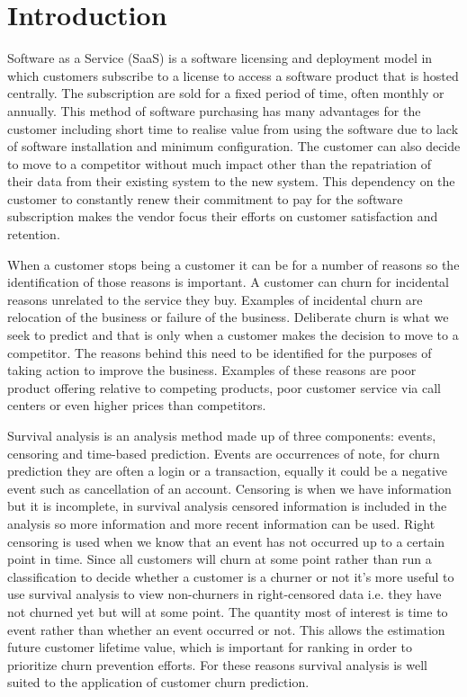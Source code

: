 \documentclass[final,a4paper,peerreviewca]{IEEEtran}
\begin{document}
\section{Introduction}
Software as a Service (SaaS) is a software licensing and deployment model in which customers subscribe to a license to access a software product that is hosted centrally. The subscription are sold for a fixed period of time, often monthly or annually. This method of software purchasing has many advantages for the customer including short time to realise value from using the software due to lack of software installation and minimum configuration. The customer can also decide to move to a competitor without much impact other than the repatriation of their data from their existing system to the new system. This dependency on the customer to constantly renew their commitment to pay for the software subscription makes the vendor focus their efforts on customer satisfaction and retention.

When a customer stops being a customer it can be for a number of reasons so the identification of those reasons is important. A customer can churn for incidental reasons unrelated to the service they buy. Examples of incidental churn are relocation of the business or failure of the business. Deliberate churn is what we seek to predict and that is only when a customer makes the decision to move to a competitor. The reasons behind this need to be identified for the purposes of taking action to improve the business. Examples of these reasons are poor product offering relative to competing products, poor customer service via call centers or even higher prices than competitors.

Survival analysis is an analysis method made up of three components: events, censoring and time-based prediction. Events are occurrences of note, for churn prediction they are often a login or a transaction, equally it could be a negative event such as cancellation of an account. Censoring is when we have information but it is incomplete, in survival analysis censored information is included in the analysis so more information and more recent information can be used. Right censoring is used when we know that an event has not occurred up to a certain point in time. Since all customers will churn at some point rather than run a classification to decide whether a customer is a churner or not it's more useful to use survival analysis to view non-churners in right-censored data i.e. they have not churned yet but will at some point. The quantity most of interest is time to event rather than whether an event occurred or not. This allows the estimation future customer lifetime value, which is important for ranking in order to prioritize churn prevention efforts. For these reasons survival analysis is well suited to the application of customer churn prediction.
\end{document}

